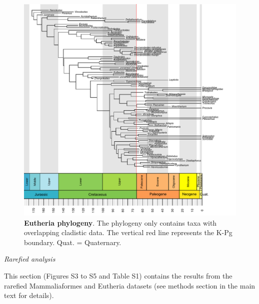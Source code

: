 \documentclass[12pt,letterpaper]{article}
\renewcommand{\subsection}[1]{%
\bigskip
\begin{center}
\begin{large}
\normalfont\itshape #1
\end{large}
\end{center}}
\begin{document}
\begin{figure}[!htbp]
\centering
    \includegraphics[keepaspectratio=true]{Figures/Figure_S2.pdf}
\caption{\textbf{Eutheria phylogeny}. The phylogeny only contains taxa with overlapping cladistic data. The vertical red line represents the K-Pg boundary. Quat. = Quaternary.}
\end{figure}

\subsection{Rarefied analysis}
This section (Figures S3 to S5 and Table S1) contains the results from the rarefied Mammaliaformes and Eutheria datasets (see methods section in the main text for details).
\end{document}
